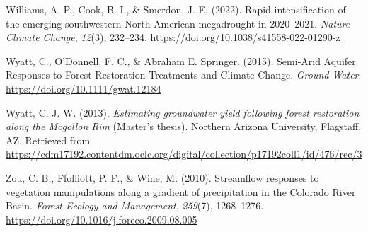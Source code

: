 \documentclass[
]{agujournal2019}
\newlength{\cslhangindent}
\newenvironment{CSLReferences}[2] %
 {\begin{list}{}{%
  \setlength{\itemindent}{0pt}
  \setlength{\leftmargin}{0pt}
  \setlength{\parsep}{0pt}
  \ifodd #1
   \setlength{\leftmargin}{\cslhangindent}
   \setlength{\itemindent}{-1\cslhangindent}
  \fi
  \setlength{\itemsep}{#2\baselineskip}}}
 {\end{list}}
\begin{document}
\begin{CSLReferences}{1}{0}
Williams, A. P., Cook, B. I., \& Smerdon, J. E. (2022). Rapid
intensification of the emerging southwestern {North} {American}
megadrought in 2020--2021. \emph{Nature Climate Change}, \emph{12}(3),
232--234. \url{https://doi.org/10.1038/s41558-022-01290-z}

Wyatt, C., O'Donnell, F. C., \& Abraham E. Springer. (2015). Semi‐{Arid}
{Aquifer} {Responses} to {Forest} {Restoration} {Treatments} and
{Climate} {Change}. \emph{Ground Water}.
\url{https://doi.org/10.1111/gwat.12184}

Wyatt, C. J. W. (2013). \emph{Estimating groundwater yield following
forest restoration along the {Mogollon} {Rim}} (Master's thesis).
Northern Arizona University, Flagstaff, AZ. Retrieved from
\url{https://cdm17192.contentdm.oclc.org/digital/collection/p17192coll1/id/476/rec/3}

Zou, C. B., Ffolliott, P. F., \& Wine, M. (2010). Streamflow responses
to vegetation manipulations along a gradient of precipitation in the
{Colorado} {River} {Basin}. \emph{Forest Ecology and Management},
\emph{259}(7), 1268--1276.
\url{https://doi.org/10.1016/j.foreco.2009.08.005}

\end{CSLReferences}
\end{document}
